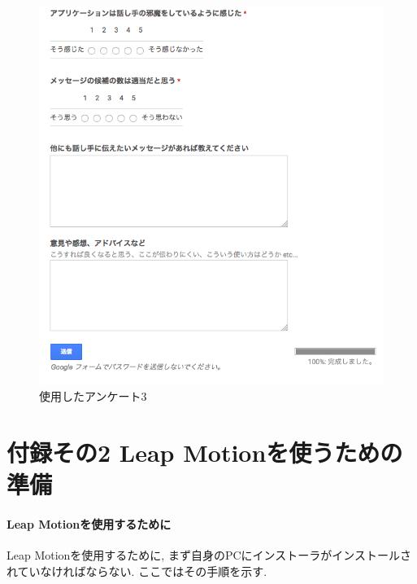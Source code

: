 \documentclass{funthesis}
\begin{document}
 \begin{figure}[H]
 \begin{center}
  \includegraphics[width=120mm]{./img/ank3.png}
 \end{center}
 \caption{使用したアンケート3}
 \label{leap}
\end{figure}


\chapter*{付録その2 Leap Motionを使うための準備}
\subsubsection{Leap Motionを使用するために}
Leap Motionを使用するために, まず自身のPCにインストーラがインストールされていなければならない. ここではその手順を示す.\\


\end{document}

